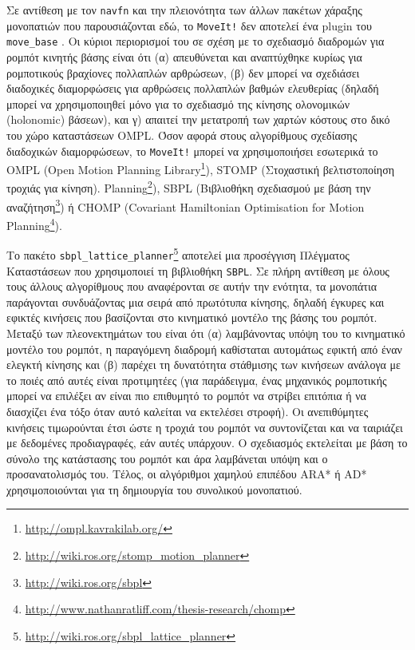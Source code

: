 Σε αντίθεση με τον \texttt{navfn} και την πλειονότητα των άλλων πακέτων
χάραξης μονοπατιών που παρουσιάζονται εδώ, το \texttt{MoveIt!} δεν αποτελεί
ένα plugin του \texttt{move\_base} \cite{Chitta2012}. Οι κύριοι περιορισμοί του
σε σχέση με το σχεδιασμό διαδρομών για ρομπότ κινητής βάσης είναι ότι (α)
απευθύνεται και αναπτύχθηκε κυρίως για ρομποτικούς βραχίονες πολλαπλών
αρθρώσεων, (β) δεν μπορεί να σχεδιάσει διαδοχικές διαμορφώσεις για αρθρώσεις
πολλαπλών βαθμών ελευθερίας (δηλαδή μπορεί να χρησιμοποιηθεί μόνο για το
σχεδιασμό της κίνησης ολονομικών (holonomic) βάσεων), και γ) απαιτεί
την μετατροπή των χαρτών κόστους στο δικό του χώρο καταστάσεων OMPL. Όσον
αφορά στους αλγορίθμους σχεδίασης διαδοχικών διαμορφώσεων, το \texttt{MoveIt!}
μπορεί να χρησιμοποιήσει εσωτερικά το OMPL (Open Motion Planning
Library\footnote{\url{http://ompl.kavrakilab.org/}}), STOMP (Στοχαστική
βελτιστοποίηση τροχιάς για κίνηση).
Planning\footnote{\url{http://wiki.ros.org/stomp\_motion\_planner}}), SBPL
(Βιβλιοθήκη σχεδιασμού με βάση την
αναζήτηση\footnote{\url{http://wiki.ros.org/sbpl}}) ή CHOMP (Covariant
Hamiltonian Optimisation for Motion
Planning\footnote{\url{http://www.nathanratliff.com/thesis-research/chomp}}).

Το πακέτο
\texttt{sbpl\_lattice\_planner}\footnote{\url{http://wiki.ros.org/sbpl\_lattice\_planner}}
αποτελεί μια προσέγγιση Πλέγματος Καταστάσεων \cite{MikhailPivtoraiko2005} που
χρησιμοποιεί τη βιβλιοθήκη \texttt{SBPL}. Σε πλήρη αντίθεση με όλους τους
άλλους αλγορίθμους που αναφέρονται σε αυτήν την ενότητα, τα μονοπάτια
παράγονται συνδυάζοντας μια σειρά από πρωτότυπα κίνησης, δηλαδή έγκυρες και
εφικτές κινήσεις που βασίζονται στο κινηματικό μοντέλο της βάσης του ρομπότ.
Μεταξύ των πλεονεκτημάτων του είναι ότι (α) λαμβάνοντας υπόψη του το κινηματικό
μοντέλο του ρομπότ, η παραγόμενη διαδρομή καθίσταται αυτομάτως εφικτή από έναν
ελεγκτή κίνησης και (β) παρέχει τη δυνατότητα στάθμισης των κινήσεων ανάλογα με
το ποιές από αυτές είναι προτιμητέες (για παράδειγμα, ένας μηχανικός ρομποτικής
μπορεί να επιλέξει αν είναι πιο επιθυμητό το ρομπότ να στρίβει επιτόπια ή
να διασχίζει ένα τόξο όταν αυτό καλείται να εκτελέσει στροφή). Οι ανεπιθύμητες
κινήσεις τιμωρούνται έτσι ώστε η τροχιά του ρομπότ να συντονίζεται και να
ταιριάζει με δεδομένες προδιαγραφές, εάν αυτές υπάρχουν. Ο σχεδιασμός
εκτελείται με βάση το σύνολο της κατάστασης του ρομπότ και άρα λαμβάνεται υπόψη
και ο προσανατολισμός του.  Τέλος, οι αλγόριθμοι χαμηλού επιπέδου ARA*
\cite{Maxim2003} ή AD* \cite{Maxim2005} χρησιμοποιούνται για τη δημιουργία του
συνολικού μονοπατιού.

